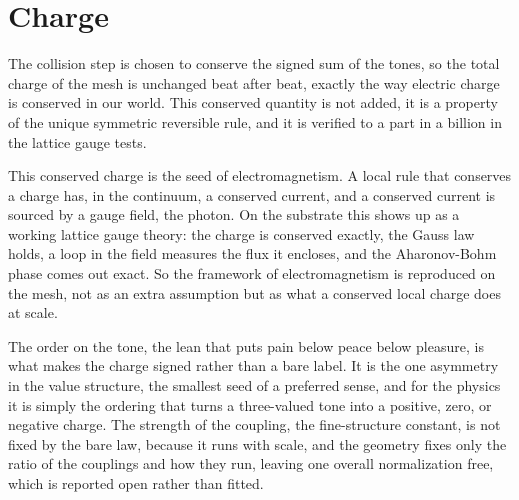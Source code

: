 \section{Charge}

The collision step is chosen to conserve the signed sum of the tones, so the total charge of the mesh is unchanged beat
after beat, exactly the way electric charge is conserved in our world. This conserved quantity is not added, it is a
property of the unique symmetric reversible rule, and it is verified to a part in a billion in the lattice gauge tests.

This conserved charge is the seed of electromagnetism. A local rule that conserves a charge has, in the continuum, a
conserved current, and a conserved current is sourced by a gauge field, the photon. On the substrate this shows up as a
working lattice gauge theory: the charge is conserved exactly, the Gauss law holds, a loop in the field measures the
flux it encloses, and the Aharonov-Bohm phase comes out exact. So the framework of electromagnetism is reproduced on the
mesh, not as an extra assumption but as what a conserved local charge does at scale.

The order on the tone, the lean that puts pain below peace below pleasure, is what makes the charge signed rather than a
bare label. It is the one asymmetry in the value structure, the smallest seed of a preferred sense, and for the physics
it is simply the ordering that turns a three-valued tone into a positive, zero, or negative charge. The strength of the
coupling, the fine-structure constant, is not fixed by the bare law, because it runs with scale, and the geometry fixes
only the ratio of the couplings and how they run, leaving one overall normalization free, which is reported open rather
than fitted.
